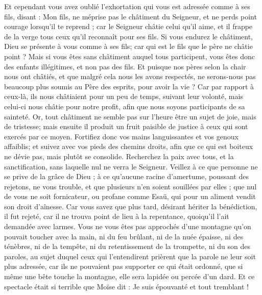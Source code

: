 \begin{multicols}{2}
Et cependant vous avez oublié l'exhortation qui vous est adressée comme à ses fils, disant : Mon fils, ne méprise pas le châtiment du Seigneur, et ne perds point courage lorsqu'il te reprend ;
car le Seigneur châtie celui qu'il aime, et il frappe de la verge tous ceux qu'il reconnaît pour ses fils.
Si vous endurez le châtiment, Dieu se présente à vous comme à ses fils; car qui est le fils que le père ne châtie point ?
Mais si vous êtes sans châtiment auquel tous participent, vous êtes donc des enfants illégitimes, et non pas des fils.
Et puisque nos pères selon la chair nous ont châtiés, et que malgré cela nous les avons respectés, ne serons-nous pas beaucoup plus soumis au Père des esprits, pour avoir la vie ?
Car par rapport à ceux-là, ils nous châtiaient pour un peu de temps, suivant leur volonté, mais celui-ci nous châtie pour notre profit, afin que nous soyons participants de sa sainteté.
Or, tout châtiment ne semble pas sur l'heure être un sujet de joie, mais de tristesse; mais ensuite il produit un fruit paisible de justice à ceux qui sont exercés par ce moyen.
Fortifiez donc vos mains languissantes et vos genoux affaiblis;
et suivez avec vos pieds des chemins droits, afin que ce qui est boiteux ne dévie pas, mais plutôt se consolide.
Recherchez la paix avec tous, et la sanctification, sans laquelle nul ne verra le Seigneur.
Veillez à ce que personne ne se prive de la grâce de Dieu ; à ce qu'aucune racine d'amertume, poussant des rejetons, ne vous trouble, et que plusieurs n'en soient souillées par elles ;
que nul {de vous } ne soit fornicateur, ou profane comme Esaü, qui pour un aliment vendit son droit d'aînesse.
Car vous savez que plus tard, désirant hériter la bénédiction, il fut rejeté, car il ne trouva point de lieu à la repentance, quoiqu'il l'ait demandée avec larmes.
Vous ne vous êtes pas approchés d'une montagne qu'on pouvait toucher avec la main, ni du feu brûlant, ni de la nuée épaisse, ni des ténèbres, ni de la tempête,
ni du retentissement de la trompette, ni du son des paroles, au sujet duquel ceux qui l'entendirent prièrent que la parole ne leur soit plus adressée,
car ils ne pouvaient pas supporter ce qui était ordonné, que si même une bête touche la montagne, elle sera lapidée ou percée d'un dard.
Et ce spectacle était si terrible que Moïse dit : Je suis épouvanté et tout tremblant !

\end{multicols}

